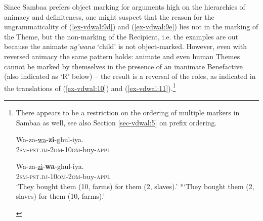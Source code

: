 \documentclass[output=paper
,modfonts
,nonflat]{langsci/langscibook}
\begin{document}
Since Sambaa prefers object marking for arguments high on the hierarchies of animacy and definiteness, one might suspect that the reason for the ungrammaticality of (\ref{ex-vdwal:9d}) and (\ref{ex-vdwal:9e}) lies not in the marking of the Theme, but the non-marking of the Recipient, i.e. the examples are out because the animate \textit{ng’wana} ‘child’ is not object-marked. However, even with reversed animacy the same pattern holds: animate and even human Themes cannot be marked by themselves in the presence of an inanimate Benefactive (also indicated as ‘R’ below) – the result is a reversal of the roles, as indicated in the translations of (\ref{ex-vdwal:10}) and (\ref{ex-vdwal:11}).\footnote{There appears to be a restriction on the ordering of multiple markers in Sambaa as well, see also Section \ref{sec-vdwal:5} on prefix ordering.
\begin{exe}
\ex \settowidth{}
\gll *Wa-za-\underline{wa}-\textbf{zi}-ghul-iya.\\
\textsc{2sm-pst.dj-2om-10om}-buy-\textsc{appl}	\\
\end{exe}
\begin{exe} 
\ex \settowidth{}
\gll Wa-za-\underline{zi}-\textbf{wa}-ghul-iya.\\
\textsc{2sm-pst.dj-10om-2om}-buy-\textsc{appl}\\
\glt `They bought them (10, farms) for them (2, slaves).'
*`They bought them (2, slaves) for them (10, farms).'
\end{exe}}
\end{document}
